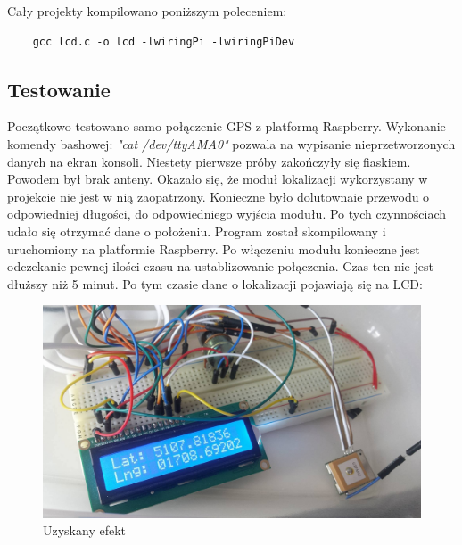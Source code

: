 \documentclass{article}
\begin{document}
	Cały projekty kompilowano poniższym poleceniem:
	\begin{verbatim}
	gcc lcd.c -o lcd -lwiringPi -lwiringPiDev
	\end{verbatim}
	\subsection{Testowanie}	
	Początkowo testowano samo połączenie GPS z platformą Raspberry. Wykonanie komendy bashowej:
	\textit{"cat /dev/ttyAMA0"}
	pozwala na wypisanie nieprzetworzonych danych na ekran konsoli. Niestety pierwsze próby zakończyły się fiaskiem. Powodem był brak anteny. Okazało się, że moduł lokalizacji wykorzystany w projekcie nie jest w nią zaopatrzony. Konieczne było dolutownaie przewodu o odpowiedniej długości, do odpowiedniego wyjścia modułu. Po tych czynnościach udało się otrzymać dane o położeniu.
	Program został skompilowany i uruchomiony na platformie Raspberry. Po włączeniu modułu konieczne jest odczekanie pewnej ilości czasu na ustablizowanie połączenia. Czas ten nie jest dłuższy niż 5 minut. Po tym czasie dane o lokalizacji pojawiają się na LCD:
	
		\begin{figure}[H]
		\centering
		\includegraphics[width=0.9\linewidth]{efekt1.jpg}
		\caption{Uzyskany efekt}
		\end{figure}
\end{document}
